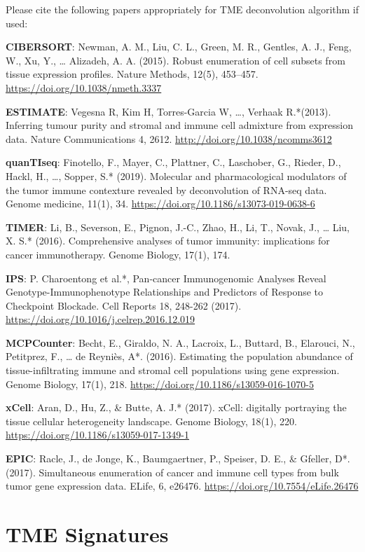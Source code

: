 \documentclass[
  12pt,
]{book}
\theoremstyle{definition}
\theoremstyle{definition}
\theoremstyle{definition}
\theoremstyle{definition}
\theoremstyle{remark}
\begin{document}
Please cite the following papers appropriately for TME deconvolution algorithm if used:

\textbf{CIBERSORT}: Newman, A. M., Liu, C. L., Green, M. R., Gentles, A. J., Feng, W., Xu, Y., \ldots{} Alizadeh, A. A. (2015). Robust enumeration of cell subsets from tissue expression profiles. Nature Methods, 12(5), 453--457. \url{https://doi.org/10.1038/nmeth.3337}

\textbf{ESTIMATE}: Vegesna R, Kim H, Torres-Garcia W, \ldots, Verhaak R.*(2013). Inferring tumour purity and stromal and immune cell admixture from expression data. Nature Communications 4, 2612. \url{http://doi.org/10.1038/ncomms3612}

\textbf{quanTIseq}: Finotello, F., Mayer, C., Plattner, C., Laschober, G., Rieder, D., Hackl, H., \ldots, Sopper, S.* (2019). Molecular and pharmacological modulators of the tumor immune contexture revealed by deconvolution of RNA-seq data. Genome medicine, 11(1), 34. \url{https://doi.org/10.1186/s13073-019-0638-6}

\textbf{TIMER}: Li, B., Severson, E., Pignon, J.-C., Zhao, H., Li, T., Novak, J., \ldots{} Liu, X. S.* (2016). Comprehensive analyses of tumor immunity: implications for cancer immunotherapy. Genome Biology, 17(1), 174.

\textbf{IPS}: P. Charoentong et al.*, Pan-cancer Immunogenomic Analyses Reveal Genotype-Immunophenotype Relationships and Predictors of Response to Checkpoint Blockade. Cell Reports 18, 248-262 (2017). \url{https://doi.org/10.1016/j.celrep.2016.12.019}

\textbf{MCPCounter}: Becht, E., Giraldo, N. A., Lacroix, L., Buttard, B., Elarouci, N., Petitprez, F., \ldots{} de Reyniès, A*. (2016). Estimating the population abundance of tissue-infiltrating immune and stromal cell populations using gene expression. Genome Biology, 17(1), 218. \url{https://doi.org/10.1186/s13059-016-1070-5}

\textbf{xCell}: Aran, D., Hu, Z., \& Butte, A. J.* (2017). xCell: digitally portraying the tissue cellular heterogeneity landscape. Genome Biology, 18(1), 220. \url{https://doi.org/10.1186/s13059-017-1349-1}

\textbf{EPIC}: Racle, J., de Jonge, K., Baumgaertner, P., Speiser, D. E., \& Gfeller, D*. (2017). Simultaneous enumeration of cancer and immune cell types from bulk tumor gene expression data. ELife, 6, e26476. \url{https://doi.org/10.7554/eLife.26476}

\hypertarget{tme-signatures}{%
\section{TME Signatures}\label{tme-signatures}}
\end{document}
